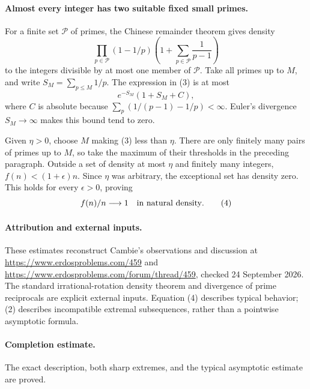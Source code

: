 \paragraph{Almost every integer has two suitable fixed small primes.}
For a finite set \(\mathcal P\) of primes, the Chinese remainder
theorem gives density
\[
 \prod_{p\in\mathcal P}(1-1/p)
 \left(1+\sum_{p\in\mathcal P}\frac1{p-1}\right)
 \tag{3}
\]
to the integers divisible by at most one member of \(\mathcal P\).
Take all primes up to \(M\), and write \(S_M=\sum_{p\leq M}1/p\).
The expression in (3) is at most
\[
 e^{-S_M}(1+S_M+C),
\]
where \(C\) is absolute because
\(\sum_p(1/(p-1)-1/p)<\infty\).
Euler's divergence \(S_M\to\infty\) makes this bound tend to zero.

Given \(\eta>0\), choose \(M\) making (3) less than \(\eta\).
There are only finitely many pairs of primes up to \(M\), so take
the maximum of their thresholds in the preceding paragraph.
Outside a set of density at most \(\eta\) and finitely many integers,
\(f(n)<(1+\epsilon)n\). Since \(\eta\) was arbitrary, the exceptional
set has density zero. This holds for every \(\epsilon>0\), proving
\[
 f(n)/n\longrightarrow1\quad\hbox{in natural density}.
 \tag{4}
\]

\paragraph{Attribution and external inputs.}
These estimates reconstruct Cambie's observations and discussion at
\url{https://www.erdosproblems.com/459} and
\url{https://www.erdosproblems.com/forum/thread/459},
checked 24 September 2026. The standard irrational-rotation density
theorem and divergence of prime reciprocals are explicit external inputs.
Equation (4) describes typical behavior; (2) describes incompatible
extremal subsequences, rather than a pointwise asymptotic formula.

\paragraph{Completion estimate.}
The exact description, both sharp extremes, and the typical asymptotic estimate are proved.
